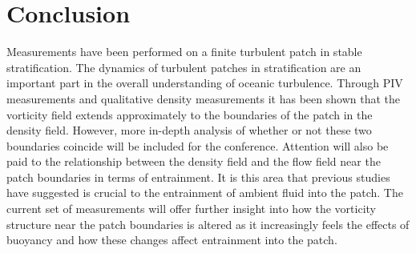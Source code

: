 \documentclass[10pt,a4paper]{article}
\begin{document}
\section{Conclusion}

Measurements have been performed on a finite turbulent patch in stable stratification.  The dynamics of turbulent patches in stratification are an important part in the overall understanding of oceanic turbulence.  Through PIV measurements and qualitative density measurements it has been shown that the vorticity field extends approximately to the boundaries of the patch in the density field.  However, more in-depth analysis of whether or not these two boundaries coincide will be included for the conference.  Attention will also be paid to the relationship between the density field and the flow field near the patch boundaries in terms of entrainment.  It is this area that previous studies have suggested is crucial to the entrainment of ambient fluid into the patch.  The current set of measurements will offer further insight into how the vorticity structure near the patch boundaries is altered as it increasingly feels the effects of buoyancy and how these changes affect entrainment into the patch.  


%

\end{document}
